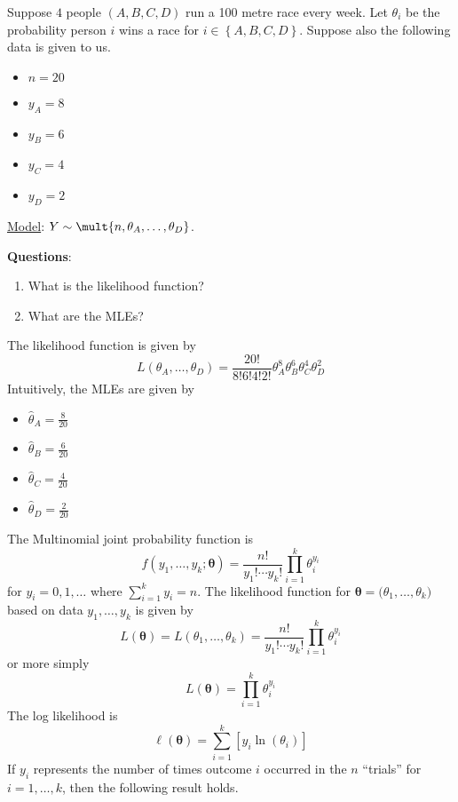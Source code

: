 \begin{Example}{}{}
    Suppose $ 4 $ people $ (A,B,C,D) $ run a 100 metre race every week.
    Let $ \theta_i $ be the probability person $ i $ wins a race for
    $ i\in\left\{ A,B,C,D\right\} $.
    Suppose also the following data is given to us.
    \begin{itemize}
        \item $ n=20 $
        \item $ y_A=8 $
        \item $ y_B=6 $
        \item $ y_C=4 $
        \item $ y_D=2 $
    \end{itemize}
    \underline{Model}: $ Y \sim \mult{n,\theta_A,\ldots ,\theta_D} $.

    \textbf{Questions}:
    \begin{enumerate}[label=(\alph*)]
        \item What is the likelihood function?
        \item What are the MLEs?
    \end{enumerate}
    The likelihood function is given by
    \[ L(\theta_A,\ldots ,\theta_D)=\frac{20!}{8!6!4!2!} \theta_A^8\theta_B^6\theta_C^4\theta_D^2 \]
    Intuitively, the MLEs are given by
    \begin{itemize}
        \item $ \hat{\theta}_A=\frac{8}{20} $
        \item $ \hat{\theta}_B=\frac{6}{20} $
        \item $ \hat{\theta}_C=\frac{4}{20} $
        \item $ \hat{\theta}_D=\frac{2}{20} $
    \end{itemize}
\end{Example}


The Multinomial joint probability function is
\[ f(y_1,\ldots ,y_k;\symbf{\theta})=\frac{n!}{y_1!\cdots y_k!}\prod_{i=1}^k \theta_i^{y_i} \]
for $ y_i=0,1,\ldots $ where $ \sum\limits_{i=1}^{k} y_i = n $.
The likelihood function for $ \symbf{\theta}=\symbf(\theta_1,\ldots ,\theta_k) $ based on data
$ y_1,\ldots ,y_k $ is given by
\[ L(\symbf{\theta})=L(\theta_1,\ldots ,\theta_k)=\frac{n!}{y_1!\cdots y_k!} \prod_{i=1}^k
    \theta_i^{y_i} \]
or more simply
\[ L(\symbf{\theta})=\prod_{i=1}^k \theta_i^{y_i} \]
The log likelihood is
\[ \ell(\symbf{\theta})=\sum\limits_{i=1}^{k} \left[ y_i\ln(\theta_i) \right] \]
If $ y_i $ represents the number of times outcome $ i $ occurred in the $ n $ ``trials''
for $ i=1,\ldots ,k $, then the following result holds.

